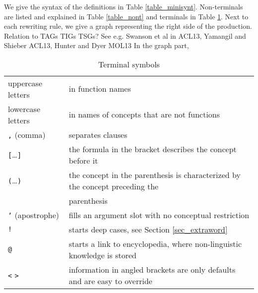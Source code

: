\documentclass[a4paper,10pt]{article}
\begin{document}
We give the syntax of the definitions in Table \ref{table_minisynt}. Non-terminals are listed and explained in Table \ref{table_nont} and terminals  in Table \ref{table_termin}. Next to each rewriting rule, we give a graph representing the right side of the production. 
 {\color{red} Relation to TAGs TIGs TSGs? See e.g. Swanson
  et al in ACL13, Yamangil and Shieber ACL13, Hunter and Dyer MOL13}
In the graph part,

\begin{table}[h]
\begin{center}
\begin{tabular}{ll}
 uppercase letters & in function names
\\ lowercase letters & in names of concepts that are not functions
\\ \texttt{,} (comma) & separates clauses
\\ \texttt{[}\ldots \texttt{]} & the formula in the bracket describes the concept before it
\\ \texttt{(}\ldots \texttt{)} & the concept in the parenthesis is characterized by the concept preceding the \\ & parenthesis
\\ \texttt{'} (apostrophe) & fills an argument slot with no conceptual restriction
\\ \texttt{!} & starts deep cases, see Section \ref{sec_extraword}
\\ \texttt{@} & starts a link to encyclopedia, where non-linguistic knowledge is stored
\\ \texttt{<} \texttt{>}& information in angled brackets are only defaults and are easy to override
\end{tabular}
\end{center}
\caption{Terminal symbols}
\label{table_termin}
\end{table}
\end{document}
